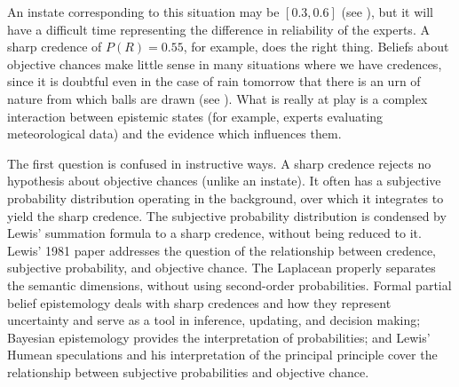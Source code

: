 An instate corresponding to this situation may be
$[0.3,0.6]$ (see ), but it will
have a difficult time representing the difference in
reliability of the experts. A sharp credence of
$P(R)=0.55$, for example, does the right thing. Beliefs
about objective chances make little sense in many
situations where we have credences, since it is
doubtful even in the case of rain tomorrow that there
is an urn of nature from which balls are drawn (see
). What is really at play is a
complex interaction between epistemic states (for
example, experts evaluating meteorological data) and
the evidence which influences them.


The first question is confused in instructive ways. A
sharp credence rejects no hypothesis about objective
chances (unlike an instate). It often has a subjective
probability distribution operating in the background,
over which it integrates to yield the sharp credence.
The subjective probability distribution is condensed by
Lewis' summation formula to a sharp credence, without
being reduced to it. Lewis' 1981 paper  addresses
the question of the relationship between credence,
subjective probability, and objective chance. The
Laplacean properly separates the semantic dimensions,
without using second-order probabilities. Formal
partial belief epistemology deals with sharp credences
and how they represent uncertainty and serve as a tool
in inference, updating, and decision making; Bayesian
epistemology provides the interpretation of
probabilities; and Lewis' Humean speculations and his
interpretation of the principal principle cover the
relationship between subjective probabilities and
objective chance.

